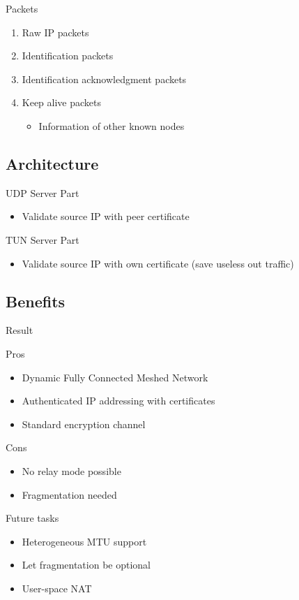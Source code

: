 \documentclass{beamer}
\newcommand*{\comparativeframe}[5]{
\begin{frame}{#1}
	#2
	\begin{exampleblock}{Pros}
		\begin{itemize}
		#3
		\end{itemize}
	\end{exampleblock}
	\begin{alertblock}{Cons}
		\begin{itemize}
		#4
		\end{itemize}
	\end{alertblock}
	#5
\end{frame}
}
\begin{document}
\begin{frame}{Packets}
	\begin{enumerate}
	\item Raw IP packets
	\item Identification packets
	\item Identification acknowledgment packets
	\item Keep alive packets
		\begin{itemize}
		\item Information of other known nodes
		\end{itemize}
	\end{enumerate}
\end{frame}
\subsection{Architecture}
\begin{frame}{UDP Server Part}
	\begin{itemize}
	\item Validate source IP with peer certificate
	\end{itemize}
\end{frame}
\begin{frame}{TUN Server Part}
	\begin{itemize}
	\item Validate source IP with own certificate (save useless out traffic)
	\end{itemize}
\end{frame}
\subsection{Benefits}
\comparativeframe{Result}{}
{%
\item Dynamic Fully Connected Meshed Network
\item Authenticated IP addressing with certificates
\item Standard encryption channel
}{%
\item No relay mode possible
\item Fragmentation needed
}{
\begin{block}{Future tasks}\begin{itemize}
\item Heterogeneous MTU support
\item Let fragmentation be optional
\item User-space NAT
\end{itemize}\end{block}
}
\end{document}
